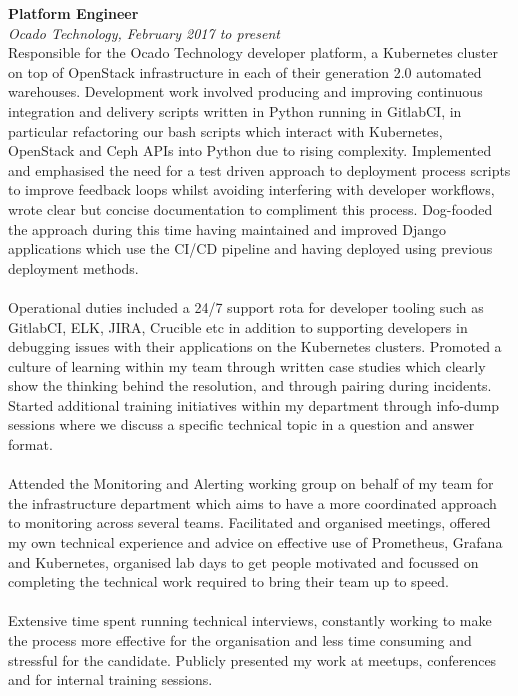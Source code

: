 \documentclass{article}
\begin{document}
\begin{flushleft}
\textbf{Platform Engineer}\\
\textit{Ocado Technology, February 2017 to present}\\[5pt]
Responsible for the Ocado Technology developer platform, a Kubernetes cluster on top of OpenStack infrastructure in each of their generation 2.0 automated warehouses. Development work involved producing and improving continuous integration and delivery scripts written in Python running in GitlabCI, in particular refactoring our bash scripts which interact with Kubernetes, OpenStack and Ceph APIs into Python due to rising complexity. Implemented and emphasised the need for a test driven approach to deployment process scripts to improve feedback loops whilst avoiding interfering with developer workflows, wrote clear but concise documentation to compliment this process. Dog-fooded the approach during this time having maintained and improved Django applications which use the CI/CD pipeline and having deployed using previous deployment methods.


\paragraph{}Operational duties included a 24/7 support rota for developer tooling such as GitlabCI, ELK, JIRA, Crucible etc in addition to supporting developers in debugging issues with their applications on the Kubernetes clusters. Promoted a culture of learning within my team through written case studies which clearly show the thinking behind the resolution, and through pairing during incidents. Started additional training initiatives within my department through info-dump sessions where we discuss a specific technical topic in a question and answer format.

\paragraph{}Attended the Monitoring and Alerting working group on behalf of my team for the infrastructure department which aims to have a more coordinated approach to monitoring across several teams. Facilitated and organised meetings, offered my own technical experience and advice on effective use of Prometheus, Grafana and Kubernetes, organised lab days to get people motivated and focussed on completing the technical work required to bring their team up to speed. 

\paragraph{}Extensive time spent running technical interviews, constantly working to make the process more effective for the organisation and less time consuming and stressful for the candidate. Publicly presented my work at meetups, conferences and for internal training sessions.\\[10pt]


\end{flushleft}
\end{document}
